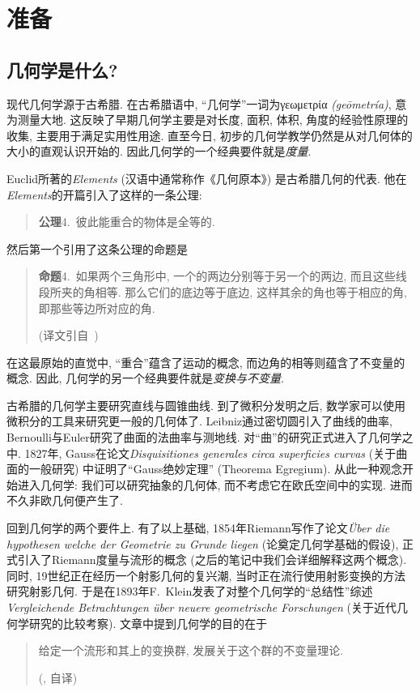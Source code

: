 \setcounter{chapter}{-1}
\chapter{准备}
\section{几何学是什么?}
现代几何学源于古希腊.
在古希腊语中, ``几何学''一词为γεωμετρία \textit{(geōmetría)}, 意为测量大地.
这反映了早期几何学主要是对长度, 面积, 体积, 角度的经验性原理的收集, 主要用于满足实用性用途.
直至今日, 初步的几何学教学仍然是从对几何体的大小的直观认识开始的.
因此几何学的一个经典要件就是\emph{度量}.

Euclid所著的\textit{Elements} (汉语中通常称作《几何原本》) 是古希腊几何的代表.
他在\textit{Elements}的开篇引入了这样的一条公理:
\begin{quotation}
    {\bfseries 公理}4.\ 彼此能重合的物体是全等的.
\end{quotation}
然后第一个引用了这条公理的命题是
\begin{quotation}
    {\bfseries 命题}4.\ 如果两个三角形中, 一个的两边分别等于另一个的两边, 而且这些线段所夹的角相等.
    那么它们的底边等于底边, 这样其余的角也等于相应的角, 即那些等边所对应的角.\\
    \begin{flushright}
        (译文引自~\parencite{Euclid_Elem})
    \end{flushright}
\end{quotation}
在这最原始的直觉中, ``重合''蕴含了运动的概念, 而边角的相等则蕴含了不变量的概念.
因此, 几何学的另一个经典要件就是\emph{变换与不变量}.

古希腊的几何学主要研究直线与圆锥曲线.
到了微积分发明之后, 数学家可以使用微积分的工具来研究更一般的几何体了.
Leibniz通过密切圆引入了曲线的曲率, Bernoulli与Euler研究了曲面的法曲率与测地线.
对``曲''的研究正式进入了几何学之中.
1827年, Gauss在论文\textit{Disquisitiones generales circa superficies curvas} (关于曲面的一般研究) 中证明了``Gauss绝妙定理'' (Theorema Egregium).
从此一种观念开始进入几何学: 我们可以研究抽象的几何体, 而不考虑它在欧氏空间中的实现.
进而不久非欧几何便产生了.

回到几何学的两个要件上.
有了以上基础, 1854年Riemann写作了论文\textit{\"{U}ber die hypothesen welche der Geometrie zu Grunde liegen} (论奠定几何学基础的假设), 正式引入了Riemann度量与流形的概念 (之后的笔记中我们会详细解释这两个概念).
同时, 19世纪正在经历一个射影几何的复兴潮, 当时正在流行使用射影变换的方法研究射影几何.
于是在1893年F.\ Klein发表了对整个几何学的``总结性''综述\textit{Vergleichende Betrachtungen \"{u}ber neuere geometrische Forschungen} (关于近代几何学研究的比较考察).
文章中提到几何学的目的在于
\begin{quotation}
    给定一个流形和其上的变换群, 发展关于这个群的不变量理论.
    \begin{flushright}
        (\parencite{Klein_Erlangen}, 自译)
    \end{flushright}
\end{quotation}

